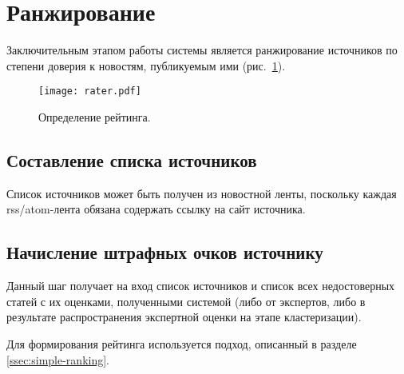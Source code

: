 \section{Ранжирование}
Заключительным этапом работы системы является ранжирование источников по степени доверия к новостям, публикуемым ими (рис.~\ref{fig:rater}).

\begin{figure}[h]
    \centering
    \texttt{[image: rater.pdf]}
    \caption{Определение рейтинга.}
    \label{fig:rater}
\end{figure}

\subsection{Составление списка источников}
Список источников может быть получен из новостной ленты, поскольку каждая rss/atom-лента обязана содержать ссылку на сайт источника.

\subsection{Начисление штрафных очков источнику}
Данный шаг получает на вход список источников и список всех недостоверных статей с их оценками, полученными системой (либо от экспертов, либо в результате распространения экспертной оценки на этапе кластеризации).

Для формирования рейтинга используется подход, описанный в разделе \ref{ssec:simple-ranking}.
